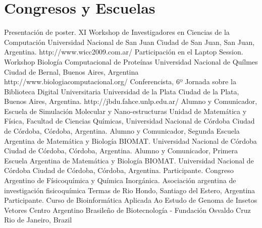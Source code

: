\section{Congresos y Escuelas}

	{Presentación de poster. XI Workshop de Investigadores en Ciencias de la Computación}
	{Universidad Nacional de San Juan}
	{Ciudad de San Juan, San Juan, Argentina.}
	{}
	{http://www.wicc2009.com.ar/}
	{Participación en el Laptop Session. Workshop Biología Computacional de Proteínas}
	{Universidad Nacional de Quílmes}
	{Ciudad de Bernal, Buenos Aires, Argentina}
	{}
	{http://www.biologiacomputacional.org/}
	{Conferencista, 6º Jornada sobre la Biblioteca Digital Universitaria}
	{Universidad de la Plata}
	{Ciudad de la Plata, Buenos Aires, Argentina.}
	{}
	{http://jbdu.fahce.unlp.edu.ar/}
	{Alumno y Comunicador, Escuela de Simulación Molecular y Nano-estructuras}
	{Unidad de Matemática y Física, Facultad de Ciencias Químicas, Universidad Nacional de Córdoba}
	{Ciudad de Córdoba, Córdoba, Argentina.}
	{}
	{}
	{Alumno y Comunicador, Segunda Escuela Argentina de Matemática y Biología}
	{BIOMAT. Universidad Nacional de Córdoba}
	{Ciudad de Córdoba, Córdoba, Argentina.}
	{}
	{}
	{Alumno y Comunicador, Primera Escuela Argentina de Matemática y Biología}
	{BIOMAT. Universidad Nacional de Córdoba}
	{Ciudad de Córdoba, Córdoba, Argentina.}
	{}
	{}
	{Participante. Congreso Argentino de Físicoquímica y Química Inorgánica.}
	{Asociación argentina de investigación fisicoquímica}
	{Termas de Rio Hondo, Santiago del Estero, Argentina}
	{}
	{}
	{Participante. Curso de Bioinformática Aplicada Ao Estudo de Genoma de Insetos Vetores}
	{Centro Argentino Brasileño de Biotecnología - Fundación Osvaldo Cruz}
	{Rio de Janeiro, Brazil}
	{}
	{}


